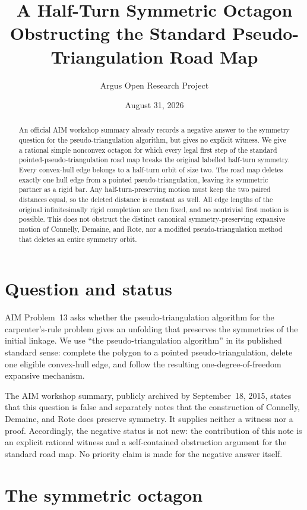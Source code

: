 \documentclass[10pt,reqno]{amsart}
\title[A symmetric obstruction to the pseudo-triangulation road map]
{A Half-Turn Symmetric Octagon Obstructing the Standard Pseudo-Triangulation Road Map}
\author{Argus Open Research Project}
\date{August 31, 2026}
\theoremstyle{definition}
\begin{document}
\begin{abstract}
An official AIM workshop summary already records a negative answer to the
symmetry question for the pseudo-triangulation algorithm, but gives no
explicit witness.  We give a rational simple nonconvex octagon for which every legal first step
of the standard pointed-pseudo-triangulation road map breaks the original
labelled half-turn symmetry.  Every convex-hull edge belongs to a half-turn
orbit of size two.  The road map deletes exactly one hull edge from a pointed
pseudo-triangulation, leaving its symmetric partner as a rigid bar.  Any
half-turn-preserving motion must keep the two paired distances equal, so the
deleted distance is constant as well.  All edge lengths of the original
infinitesimally rigid completion are then fixed, and no nontrivial first
motion is possible.  This does not obstruct the distinct canonical
symmetry-preserving expansive motion of Connelly, Demaine, and Rote, nor a
modified pseudo-triangulation method that deletes an entire symmetry orbit.
\end{abstract}

\maketitle

\section{Question and status}

AIM Problem~13 asks whether the pseudo-triangulation algorithm for the
carpenter's-rule problem gives an unfolding that preserves the symmetries of
the initial linkage.  We use ``the pseudo-triangulation algorithm'' in its
published standard sense: complete the polygon to a pointed
pseudo-triangulation, delete one eligible convex-hull edge, and follow the
resulting one-degree-of-freedom expansive mechanism.

The AIM workshop summary, publicly archived by September~18, 2015, states
that this question is false and separately notes that the construction of
Connelly, Demaine, and Rote does preserve symmetry.  It supplies neither a
witness nor a proof.  Accordingly, the negative status is not new: the
contribution of this note is an explicit rational witness and a
self-contained obstruction argument for the standard road map.  No priority
claim is made for the negative answer itself.

\section{The symmetric octagon}
\end{document}
